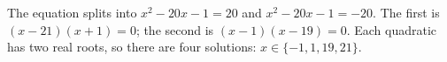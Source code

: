 The equation splits into $x^2-20x-1=20$ and $x^2-20x-1=-20$. The first is $(x-21)(x+1)=0$; the second is $(x-1)(x-19)=0$. Each quadratic has two real roots, so there are four solutions: $\boxed{x\in\{-1,1,19,21\}}$.
